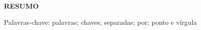 \thispagestyle{empty}
\begin{center}
\textbf{\MakeUppercase{Resumo}}
\end{center}

\lipsum[5]

\vspace{1em}

Palavras-chave: palavras; chaves; separadas; por; ponto e vírgula
\newpage